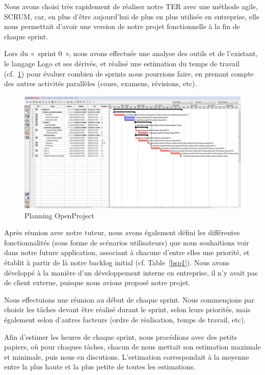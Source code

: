 Nous avons choisi très rapidement de réaliser notre TER avec une méthode agile, SCRUM, car, en plus d'être aujourd'hui de plus en plus utilisée en entreprise, elle nous permettait d'avoir une version de notre projet fonctionnelle à la fin de chaque sprint.

Lors du «~sprint 0~», nous avons effectuée une analyse des outils et de l'existant, le langage Logo et ses dérivés, et réalisé une estimation du temps de travail (cf.~\ref{planning}) pour évaluer combien de sprints nous pourrions faire, en prenant compte des autres activités parallèles (cours, examens, révisions, etc).
\begin{figure}[h]
\caption{\label{planning} Planning OpenProject}
\includegraphics[scale=0.35]{doc/gestionProjet/planning.PNG}
\end{figure}

Après réunion avec notre tuteur, nous avons également défini les différentes fonctionnalités (sous forme de scénarios utilisateurs) que nous souhaitions voir dans notre future application, associant à chacune d'entre elles une priorité, et établit à partir de là notre backlog initial (cf. Table~\ref{bsp1}).
Nous avons développé à la manière d'un développement interne en entreprise, il n'y avait pas de client externe, puisque nous avions proposé notre projet.

Nous effectuions une réunion au début de chaque sprint. Nous commençions par choisir les tâches devant être réalisé durant le sprint, selon leurs priorités, mais également selon d'autres facteurs (ordre de réalisation, temps de travail, etc). 

Afin d'estimer les heures de chaque sprint, nous procédions avec des petits papiers, où pour chaques tâches, chacun de nous mettait son estimation maximale et minimale, puis nous en discutions. L'estimation correspondait à la moyenne entre la plus haute et la plus petite de toutes les estimations. 

